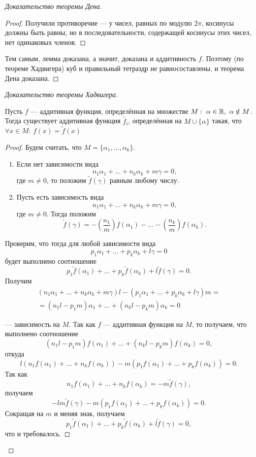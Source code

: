 \begin{proof}[Доказательство теоремы Дена]
\begin{proof}
        Получили противоречие — у чисел, равных по модулю $2 \pi$, косинусы должны быть равны, но в последовательности, содержащей косинусы этих чисел, нет одинаковых членов.
    \end{proof}
    Тем самым, лемма доказана, а значит, доказана и аддитивность $f$. Поэтому (по теореме Хадвигера) куб и правильный тетраэдр не равносоставлены, и теорема Дена доказана.
\end{proof}

\begin{proof}[Доказательство теоремы Хадвигера]

\begin{lemma}[1]
    Пусть $f$ — аддитивная функция, определённая на множестве $M: \ \alpha \in \mathbb{R}, \ \alpha \notin M$. Тогда существует аддитивная функция $\tilde{f_i}$, определённая на $M \cup \{\alpha\}$ такая, что $\forall x \in M: \ f(x) = \tilde{f}(x)$
\end{lemma}
\begin{proof}
    Будем считать, что $M = \{\alpha_1, \dots, \alpha_k\}$.
    \begin{enumerate}
        \item Если нет зависимости вида 
        \[n_1 \alpha_1 + \dots + n_k \alpha_k + m \gamma = 0,\]
        где $m \neq 0$, то положим $\tilde{f}(\gamma)$ равным любому числу.
        \item Пусть есть зависимость вида 
        \[n_1 \alpha_1 + \dots + n_k \alpha_k + m \gamma = 0,\]
        где $m \neq 0$. Тогда положим
        \[\tilde{f}(\gamma) = - \left(\frac{n_1}{m}\right) f(\alpha_1) - \dots - \left(\frac{n_k}{m}\right) f(\alpha_k).\]
    \end{enumerate}

    Проверим, что тогда для любой зависимости вида
    \[p_1 \alpha_1 + \dots + p_k \alpha_k + l \gamma = 0\]
    будет выполнено соотношение
    \[p_1 \tilde{f}(\alpha_1) + \dots + p_k \tilde{f}(\alpha_k) + l \tilde{f}(\gamma) = 0.\]
    Получим
    \begin{multline*}
        (n_1 \alpha_1 + \dots + n_k \alpha_k + m \gamma) l - (p_1 \alpha_1 + \dots + p_k \alpha_k + l \gamma) m = \\= (n_1 l - p_1 m) \alpha_1 + \dots + (n_k l - p_k m) \alpha_k = 0
    \end{multline*}

    — зависимость на $M$. Так как $f$ — аддитивная функция на $M$, то получаем, что выполнено соотношение 
    \[(n_1 l - p_1 m) f(\alpha_1) + \dots + (n_k l - p_k m) f(\alpha_k) = 0,\]
    откуда
    \[l(n_1 f(\alpha_1) + \dots + n_k f(\alpha_k)) - m (p_1 f(\alpha_1) + \dots + p_k f(\alpha_k)) = 0.\]
    Так как 
    \[n_1 f(\alpha_1) + \dots + n_k f(\alpha_k) = -m \tilde{f}(\gamma),\]
    получаем
    \[-lm \tilde{f}(\gamma) - m(p_1 f(\alpha_1) + \dots + p_k f(\alpha_k)) = 0.\]
    Сокращая на $m$ и меняя знак, получаем
    \[p_1 \tilde{f}(\alpha_1) + \dots + p_k \tilde{f}(\alpha_k) + l \tilde{f}(\gamma) = 0,\]
    что и требовалось.
    

\end{proof}
\end{proof}
